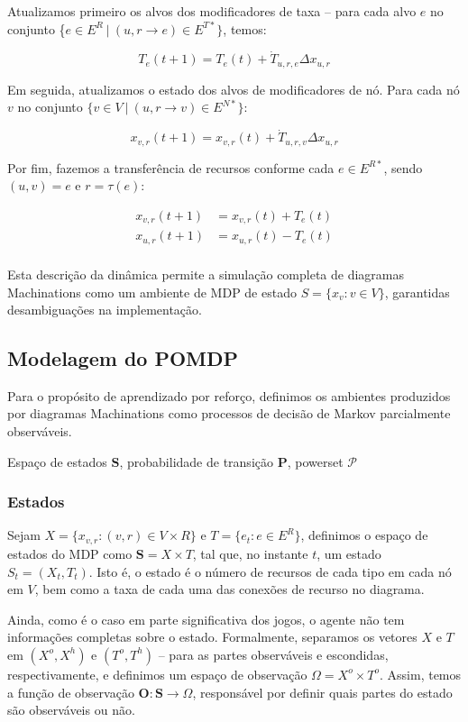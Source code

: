 \documentclass[10pt,a4paper]{article}
\newcommand{\St}{\mathbf{S}}
\newcommand{\Ptr}{\mathbf{P}}
\newcommand{\Obs}{\mathbf{O}}
\begin{document}
Atualizamos primeiro os alvos dos modificadores de taxa -- para cada alvo $e$ no conjunto \{$e \in E^R \ | \ (u, r \rightarrow e) \in E^{T*}\}$, temos:

$$
T_{e}(t+1) = T_{e}(t) + \dot{T}_{u,r,e} \Delta x_{u,r}
$$

Em seguida, atualizamos o estado dos alvos de modificadores de nó. Para cada nó $v$ no conjunto $\{v \in V \ | \ (u, r \rightarrow v) \in E^{N*}\}$:

$$
x_{v, r}(t+1) = x_{v, r}(t) + \dot{T}_{u,r,v} \Delta x_{u,r}
$$

Por fim, fazemos a transferência de recursos conforme cada $e \in E^{R*}$, sendo $(u, v) = e$ e $r = \tau(e)$:

\begin{align*}
    x_{v, r}(t+1) &= x_{v,r}(t) + T_e(t)\\
    x_{u, r}(t+1) &= x_{u,r}(t) - T_e(t)\\
\end{align*}

Esta descrição da dinâmica permite a simulação completa de diagramas Machinations como um ambiente de MDP de estado $S = \{x_v : v \in V\}$, garantidas desambiguações na implementação.

\subsection{Modelagem do POMDP}
\label{m:mdp}

Para o propósito de aprendizado por reforço, definimos os ambientes produzidos por diagramas Machinations como processos de decisão de Markov parcialmente observáveis. 

Espaço de estados $\St$, probabilidade de transição $\Ptr$, powerset $\mathcal{P}$

\subsubsection{Estados}
\label{m:mdp:states}
Sejam $X = \{x_{v,r} : (v, r) \in V \times R\}$ e $T = \{e_t : e \in E^R\}$, definimos o espaço de estados do MDP como $\St = X \times T$, tal que, no instante $t$, um estado $S_t = (X_t, T_t)$. Isto é, o estado é o número de recursos de cada tipo em cada nó em $V$, bem como a taxa de cada uma das conexões de recurso no diagrama.

Ainda, como é o caso em parte significativa dos jogos, o agente não tem informações completas sobre o estado. Formalmente, separamos os vetores $X$ e $T$ em $(X^o, X^h)$ e $(T^o, T^h)$ -- para as partes observáveis e escondidas, respectivamente, e definimos um espaço de observação $\Omega = X^o \times T^o$. Assim, temos a função de observação $\Obs : \St \rightarrow \Omega$, responsável por definir quais partes do estado são observáveis ou não.
\end{document}
